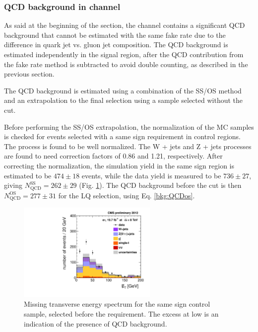 \subsubsection{QCD background in \etau channel}
\label{sec:qcdbkg}

As said at the beginning of the section, the \etau channel contains a significant QCD background that cannot be estimated with the same fake rate due to the difference in quark jet vs. gluon jet composition. The QCD background is estimated independently in the signal region, after the QCD contribution from the fake rate method is subtracted to avoid double counting, as described in the previous section.

The QCD background is estimated using a combination of the SS/OS method and an extrapolation to the final selection using a sample selected without the \MassTJ cut.

Before performing the SS/OS extrapolation, the normalization of the MC samples is checked for events selected with a same sign requirement in control regions. The \ttbar process is found to be well normalized. The W + jets and Z + jets processes are found to need correction factors of 0.86 and 1.21, respectively.
After correcting the normalization, the simulation yield in the same sign region is estimated to be $474\pm 18$ events, while the data yield is measured to be $736\pm 27$, giving $N_{\text{QCD}}^{\text{SS}}=262\pm 29$ (Fig. \ref{fig:QCDSSMET}). The QCD background before the \MassTJ cut is then $N_{\text{QCD}}^{\text{OS}} =277\pm 31$ for the LQ selection, using Eq. \eqref{bkg:QCDos}.

\begin{figure}[htbp]
  \begin{center}
    \includegraphics[width=0.6\textwidth]{figures/etau/metPtSSIso.pdf}
    \caption{Missing transverse energy spectrum for the same sign control sample, selected before the \MassTJ requirement. The excess at low \met is an indication of the presence of QCD background.}
    \label{fig:QCDSSMET}
  \end{center}
\end{figure}


